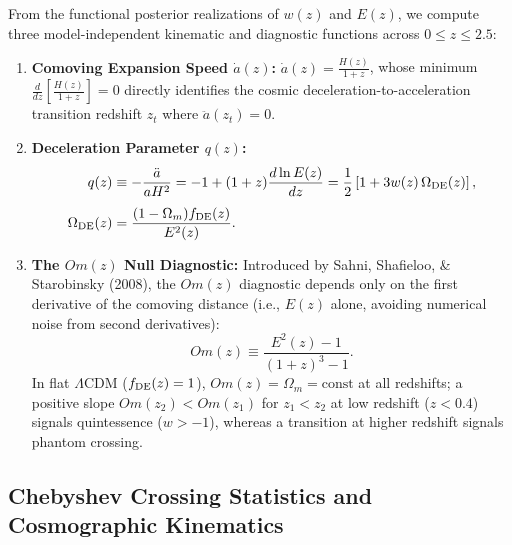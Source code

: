 \documentclass[aps,prd,preprint,superscriptaddress,nofootinbib]{revtex4-2}
\begin{document}
From the functional posterior realizations of $w(z)$ and $E(z)$, we compute three model-independent kinematic and diagnostic functions across $0 \le z \le 2.5$:
\begin{enumerate}
    \setlength{\itemsep}{3pt}
    \item \textbf{Comoving Expansion Speed $\dot{a}(z)$:} $\dot{a}(z) = \frac{H(z)}{1+z}$, whose minimum $\frac{d}{dz}\left[\frac{H(z)}{1+z}\right] = 0$ directly identifies the cosmic deceleration-to-acceleration transition redshift $z_t$ where $\ddot{a}(z_t) = 0$.
    \item \textbf{Deceleration Parameter $q(z)$:}
    \begin{equation}
    \begin{aligned}
        q(z) &\equiv -\frac{\ddot{a}}{a H^2} = -1 + (1+z)\frac{d\ln E(z)}{dz} = \frac{1}{2}\left[ 1 + 3 w(z)\, \Omega_{\rm DE}(z) \right], \\[4pt]
        \Omega_{\rm DE}(z) &= \frac{(1-\Omega_m)f_{\rm DE}(z)}{E^2(z)}.
    \end{aligned}
        \label{m:eq:qz_gp}
    \end{equation}
    \item \textbf{The $Om(z)$ Null Diagnostic:} Introduced by Sahni, Shafieloo, \& Starobinsky (2008), the $Om(z)$ diagnostic depends only on the first derivative of the comoving distance (i.e., $E(z)$ alone, avoiding numerical noise from second derivatives):
    \begin{equation}
        Om(z) \equiv \frac{E^2(z) - 1}{(1+z)^3 - 1}.
        \label{m:eq:Om_diagnostic}
    \end{equation}
    In flat $\Lambda$CDM ($f_{\rm DE}(z) = 1$), $Om(z) = \Omega_m = \text{const}$ at all redshifts; a positive slope $Om(z_2) < Om(z_1)$ for $z_1 < z_2$ at low redshift ($z < 0.4$) signals quintessence ($w > -1$), whereas a transition at higher redshift signals phantom crossing.
\end{enumerate}



\subsection{Chebyshev Crossing Statistics and Cosmographic Kinematics}
\end{document}
